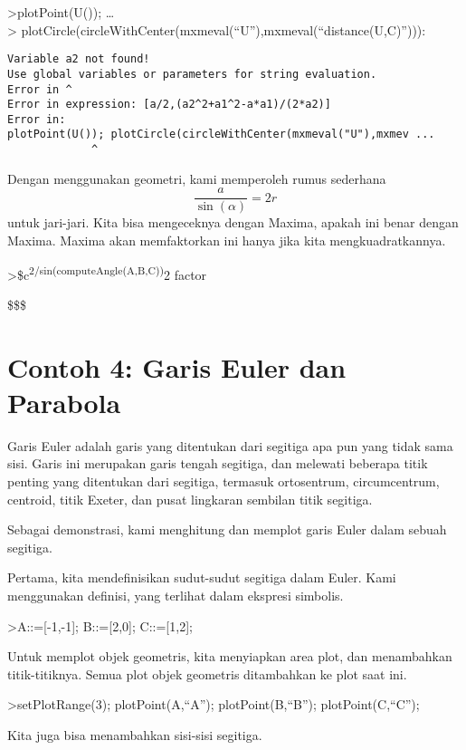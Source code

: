 \documentclass[
]{book}
\begin{document}
\textgreater plotPoint(U()); \ldots{}\\
\textgreater{} plotCircle(circleWithCenter(mxmeval(``U''),mxmeval(``distance(U,C)''))):

\begin{verbatim}
Variable a2 not found!
Use global variables or parameters for string evaluation.
Error in ^
Error in expression: [a/2,(a2^2+a1^2-a*a1)/(2*a2)]
Error in:
plotPoint(U()); plotCircle(circleWithCenter(mxmeval("U"),mxmev ...
             ^
\end{verbatim}

Dengan menggunakan geometri, kami memperoleh rumus sederhana \[\frac{a}{\sin(\alpha)}=2r\]untuk jari-jari. Kita bisa mengeceknya dengan Maxima, apakah ini benar dengan Maxima. Maxima akan memfaktorkan ini hanya jika kita mengkuadratkannya.

\textgreater\$c\textsuperscript{2/sin(computeAngle(A,B,C))}2 \textbar{} factor

\$ \$\$

\chapter{Contoh 4: Garis Euler dan Parabola}\label{contoh-4-garis-euler-dan-parabola}

Garis Euler adalah garis yang ditentukan dari segitiga apa pun yang tidak sama sisi. Garis ini merupakan garis tengah segitiga, dan melewati beberapa titik penting yang ditentukan dari segitiga, termasuk ortosentrum, circumcentrum, centroid, titik Exeter, dan pusat lingkaran sembilan titik segitiga.

Sebagai demonstrasi, kami menghitung dan memplot garis Euler dalam sebuah segitiga.

Pertama, kita mendefinisikan sudut-sudut segitiga dalam Euler. Kami menggunakan definisi, yang terlihat dalam ekspresi simbolis.

\textgreater A::={[}-1,-1{]}; B::={[}2,0{]}; C::={[}1,2{]};

Untuk memplot objek geometris, kita menyiapkan area plot, dan menambahkan titik-titiknya. Semua plot objek geometris ditambahkan ke plot saat ini.

\textgreater setPlotRange(3); plotPoint(A,``A''); plotPoint(B,``B''); plotPoint(C,``C'');

Kita juga bisa menambahkan sisi-sisi segitiga.
\end{document}
